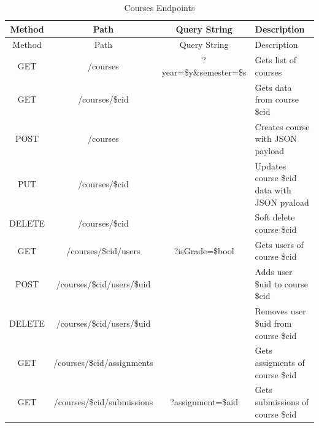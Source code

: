 \setlength{\extrarowheight}{1.5pt}
    \begin{longtable}{|c|c|c|m{4.5cm}|}
 \caption{Courses Endpoints\label{tab:coursesends}} \\
     \hline
    
    \centering  Method & Path & Query String & Description \\
    \hline \hline \endfirsthead
    
         \hline

    \centering  Method & Path & Query String & Description \\
    \hline \hline \endhead
    
    \endfoot 
    GET   & /courses & ?year=\$y\&semester=\$s & {Gets list of courses} \\ \hline
    GET   & /courses/\$cid &       & {Gets data from course \$cid} \\ \hline
    POST  & /courses &       & {Creates course with JSON payload} \\ \hline
    PUT   & /courses/\$cid &       & {Updates course \$cid data with JSON pyaload} \\ \hline
    DELETE & /courses/\$cid &       & {Soft delete course \$cid} \\ \hline
    GET   & /courses/\$cid/users & ?isGrade=\$bool & {Gets users of course \$cid} \\ \hline
    POST  & /courses/\$cid/users/\$uid &       & {Adds user \$uid to course \$cid} \\ \hline
    DELETE & /courses/\$cid/users/\$uid &       & {Removes user \$uid from course \$cid} \\ \hline
    GET   & /courses/\$cid/assignments &       & {Gets assigments of course \$cid} \\ \hline
    GET   & /courses/\$cid/submissions & ?assignment=\$aid & {Gets submissions of course \$cid} \\ \hline
\end{longtable}

